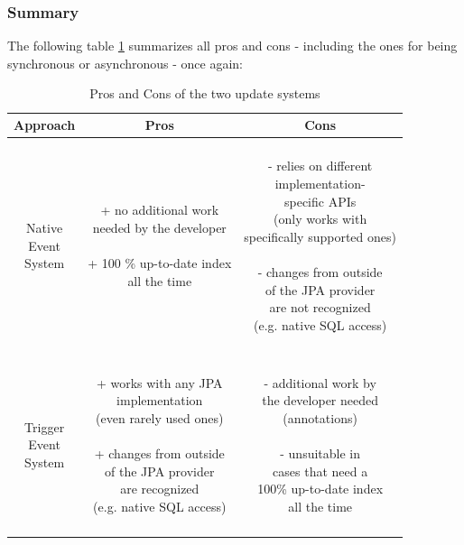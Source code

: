 \subsubsection{Summary}
The following table \ref{table:pros_and_cons_update_systems} summarizes all pros and cons - including the ones for being synchronous or asynchronous - once again:
\\
\begin{table}[h] 
	\centering
	\begin{tabular}{c||c|c}
		Approach & Pros & Cons \\ 
		\hline
		\hline
		\specialcell{Native \\ Event \\ System} & 
		\specialcell{+ no additional work \\ needed by the developer \\\\ + 100 \% up-to-date index \\ all the time} & 
		\specialcell{~\\- relies on different\\ implementation- \\ specific APIs \\ (only works with \\ specifically supported ones) \\\\
					- changes from outside\\ of the JPA provider \\are not recognized \\ (e.g. native SQL access)\\~} \\ 
		\hline
		\specialcell{Trigger \\ Event \\ System} & 
		\specialcell{~\\+ works with any JPA \\implementation \\ (even rarely used ones) \\\\
					+ changes from outside\\ of the JPA provider \\ are recognized \\ (e.g. native SQL access) \\~} & 
		\specialcell{- additional work by \\the developer needed \\ (annotations) \\\\ - unsuitable in \\ cases that need a \\ 100\% up-to-date index \\ all the time} \\ 
	\end{tabular}
	\footnotesize \caption{Pros and Cons of the two update systems}
	\label{table:pros_and_cons_update_systems}
\end{table}

